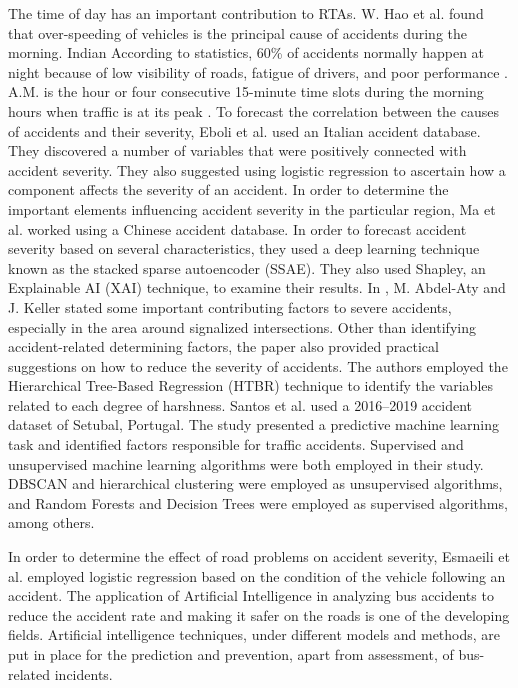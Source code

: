\documentclass[conference]{IEEEtran}
\begin{document}
The time of day has an important contribution to RTAs.  W. Hao et al. \cite{hao2016effect} found that over-speeding of vehicles is the principal cause of accidents during the morning.  Indian According to statistics, 60\% of accidents normally happen at night because of low visibility of roads, fatigue of drivers, and poor performance \cite{pitchipoo2014analysis}. A.M. is the hour or four consecutive 15-minute time slots during the morning hours when traffic is at its peak \cite{lawinsider_ampeakhour}. To forecast the correlation between the causes of accidents and their severity, Eboli et al.\cite{eboli2020factors} used an Italian accident database.  They discovered a number of variables that were positively connected with accident severity. They also suggested using logistic regression to ascertain how a component affects the severity of an accident.
 In order to determine the important elements influencing accident severity in the particular region, Ma et al.\cite{ma2021analytic} worked using a Chinese accident database.  In order to forecast accident severity based on several characteristics, they used a deep learning technique known as the stacked sparse autoencoder (SSAE).  They also used Shapley, an Explainable AI (XAI) technique, to examine their results. In \cite{abdel2005exploring}, M. Abdel-Aty and J. Keller stated some important contributing factors to severe accidents, especially in the area around signalized intersections.  Other than identifying accident-related determining factors, the paper also provided practical suggestions on how to reduce the severity of accidents.
The authors employed the Hierarchical Tree-Based Regression (HTBR) technique to identify the variables related to each degree of harshness.
Santos et al. \cite{santos2021machine} used a 2016–2019 accident dataset of Setubal, Portugal.  The study presented a predictive machine learning task and identified factors responsible for traffic accidents.  Supervised and unsupervised machine learning algorithms were both employed in their study.  DBSCAN and hierarchical clustering were employed as unsupervised algorithms, and Random Forests and Decision Trees were employed as supervised algorithms, among others.

In order to determine the effect of road problems on accident severity, Esmaeili et al.\cite{esmaeili2012determining} employed logistic regression based on the condition of the vehicle following an accident. The application of Artificial Intelligence in analyzing bus
accidents to reduce the accident rate and making it safer on
the roads is one of the developing fields. Artificial intelligence
techniques, under different models and methods, are put in
place for the prediction and prevention, apart from assessment,
of bus-related incidents.
\end{document}
